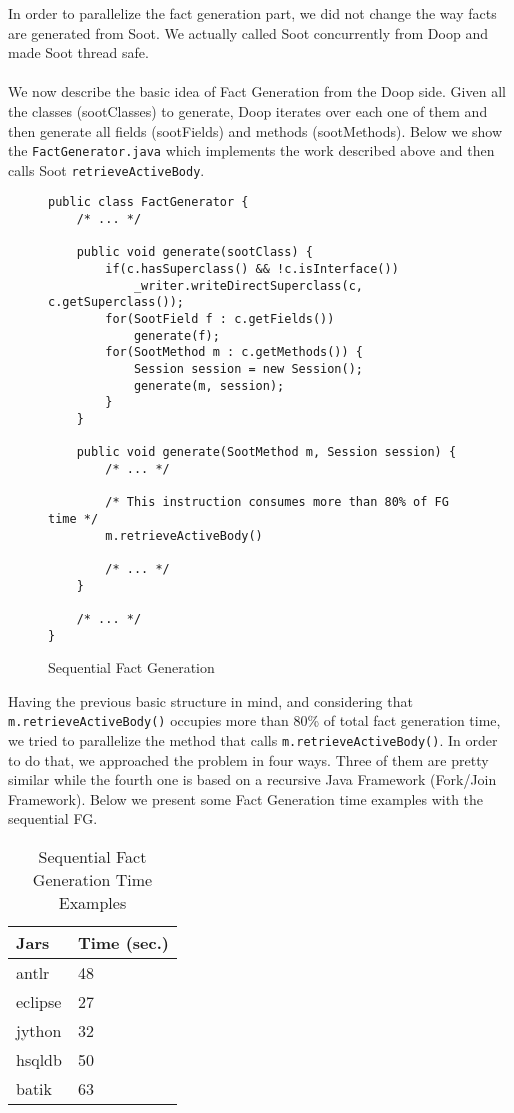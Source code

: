 \documentclass{dithesis}
\begin{document}
    In order to parallelize the fact generation part, we did not change the way facts are generated from Soot. We actually called Soot concurrently from Doop and made Soot thread safe.\\
    \\
    We now describe the basic idea of Fact Generation from the Doop side. Given all the classes (sootClasses) to generate, Doop iterates over each one of them and then generate all fields (sootFields) and methods (sootMethods). Below we show the \texttt{FactGenerator.java} which implements the work described above and then calls Soot \texttt{retrieveActiveBody}.
    \begin{figure}[H]
\begin{lstlisting}
public class FactGenerator {
    /* ... */

    public void generate(sootClass) {
        if(c.hasSuperclass() && !c.isInterface())
            _writer.writeDirectSuperclass(c, c.getSuperclass());
        for(SootField f : c.getFields())
            generate(f);
        for(SootMethod m : c.getMethods()) {
            Session session = new Session();
            generate(m, session);
        }
    }

    public void generate(SootMethod m, Session session) {
        /* ... */

        /* This instruction consumes more than 80% of FG time */
        m.retrieveActiveBody()

        /* ... */
    }

    /* ... */
}
\end{lstlisting}
    \caption{Sequential Fact Generation}
    \end{figure}

    Having the previous basic structure in mind, and considering that \texttt{m.retrieveActiveBody()} occupies more than 80\% of total fact generation time, we tried to parallelize the method that calls \texttt{m.retrieveActiveBody()}. In order to do that, we approached the problem in four ways. Three of them are pretty similar while the fourth one is based on a recursive Java Framework (Fork/Join Framework). Below we present some Fact Generation time examples with the sequential FG.
    \begin{table}[H]
		\centering
        \begin{tabular}{@{}ll@{}}
        \toprule
        \textbf{Jars} & \textbf{Time (sec.)} \\ \midrule
        antlr          & 48                    \\
        eclipse        & 27                    \\
        jython         & 32                    \\
        hsqldb         & 50                    \\
        batik          & 63                    \\ \bottomrule
        \end{tabular}
        \newline
		\caption{Sequential Fact Generation Time Examples}
	\end{table}
\end{document}
